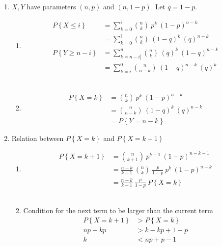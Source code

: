 \begin{enumerate}
	
	\item $ X, Y $ have parameters $ (n,p)$ and $ (n, 1-p) $. Let $ q = 1-p $. \\
	
		\begin{enumerate}
			\item \begin{align}
				P \left\{X \leq i \right\} &= \sum\limits_{k=0}^{i} \binom{n}{k} \ p^k \ (1-p)^{n-k} \nonumber \\
				&= \sum\limits_{k=0}^{i} \binom{n}{k} \ (1-q)^k \ (q)^{n-k}  \\
				P \left\{Y \geq n-i \right\}&= \sum\limits_{k=n-i]}^{n} \binom{n}{k} \ (q)^k \ (1-q)^{n-k} \nonumber \\
				&= \sum\limits_{k=i}^{0} \binom{n}{n-k} \ (1-q)^{n-k} \ (q)^{k} 
			\end{align}\\
			
			\item \begin{align}
				P \left\{X  = k\right\} &= \binom{n}{k} \ p^k \ (1-p)^{n-k} \nonumber \\
				&= \binom{n}{n-k} \ (1-q)^k \ (q)^{n-k} \nonumber \\
				&= P \left\{Y  = n-k\right\}
			\end{align}
		\end{enumerate}
	
	
	\item Relation between $ P \left\{X  = k\right\} $ and $ P \left\{X  = k+1\right\} $\\
	
		\begin{enumerate}
			\item \begin{align}
				P \left\{X = k+1 \right\} &= \binom{n}{k+1} \ p^{k+1} \ (1-p)^{n-k-1} \\
				&= \frac{n-k}{k+1}\ \binom{n}{k}\ \frac{p}{1-p} \ p^{k} \ (1-p)^{n-k} \nonumber \\
				&= \frac{n-k}{k+1}\ \frac{p}{1-p}\ P \left\{X = k \right\}
			\end{align}\\
			
			\item Condition for the next term to be larger than the current term \\
			\begin{align}
				P \left\{X = k+1 \right\} &> P \left\{X = k \right\} \nonumber \\
				np - kp &> k - kp + 1 - p \nonumber \\
				k &< np + p - 1
			\end{align}\\
			

\end{enumerate}
\end{enumerate}
